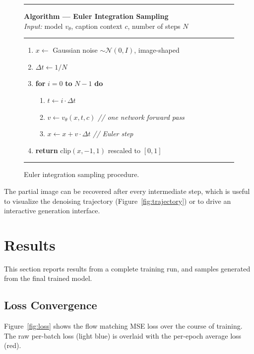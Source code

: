 \documentclass[11pt,a4paper]{article}
\begin{document}
\begin{figure}[H]
\centering
\begin{minipage}{0.85\textwidth}
\rule{\textwidth}{0.6pt}
\textbf{Algorithm --- Euler Integration Sampling}\\[2pt]
\textit{Input:} model $v_\theta$, caption context $c$, number of steps $N$
\rule{\textwidth}{0.3pt}
\begin{enumerate}[label=\arabic*., itemsep=1pt, topsep=2pt]
  \item $x \gets$ Gaussian noise $\sim \mathcal{N}(0, I)$, image-shaped
  \item $\Delta t \gets 1/N$
  \item \textbf{for} $i = 0$ \textbf{to} $N-1$ \textbf{do}
  \begin{enumerate}[label=(\alph*), itemsep=1pt]
    \item $t \gets i \cdot \Delta t$
    \item $v \gets v_\theta(x, t, c)$ \hfill \textit{// one network forward pass}
    \item $x \gets x + v \cdot \Delta t$ \hfill \textit{// Euler step}
  \end{enumerate}
  \item \textbf{return} $\mathrm{clip}(x, -1, 1)$ rescaled to $[0,1]$
\end{enumerate}
\rule{\textwidth}{0.6pt}
\end{minipage}
\caption{Euler integration sampling procedure.}
\label{alg:sampling}
\end{figure}

The partial image can be recovered after every intermediate step, which is
useful to visualize the denoising trajectory
(Figure~\ref{fig:trajectory}) or to drive an interactive generation
interface.

\section{Results}
\label{sec:results}

This section reports results from a complete training run, and samples
generated from the final trained model.

\subsection{Loss Convergence}

Figure~\ref{fig:loss} shows the flow matching MSE loss over the course of
training. The raw per-batch loss (light blue) is overlaid with the
per-epoch average loss (red).
\end{document}

